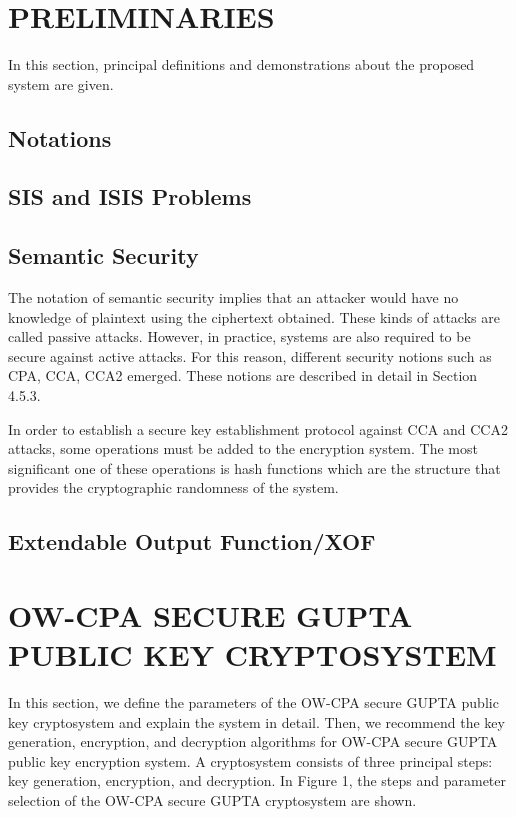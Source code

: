 \documentclass[a4paper,fleqn]{cas-dc}
\begin{document}
\section{PRELIMINARIES}

	In this section, principal definitions and demonstrations about the proposed system are given.

\subsection{Notations}


\subsection{SIS and ISIS Problems}





\subsection{Semantic Security}

	The notation of semantic security implies that an attacker would have no knowledge of plaintext using the ciphertext obtained. These kinds of attacks are called passive attacks. However, in practice, systems are also required to be secure against active attacks. For this reason, different security notions such as CPA, CCA, CCA2 emerged. These notions are described in detail in Section 4.5.3. 
	
	In order to establish a secure key establishment protocol against CCA and CCA2 attacks, some operations must be added to the encryption system. The most significant one of these operations is hash functions which are the structure that provides the cryptographic randomness of the system.

\subsection{Extendable Output Function/XOF}


\section{OW-CPA SECURE GUPTA PUBLIC KEY CRYPTOSYSTEM}
	In this section, we define the parameters of the OW-CPA secure GUPTA public key cryptosystem and explain the system in detail. Then, we recommend the key generation, encryption, and decryption algorithms for OW-CPA secure GUPTA public key encryption system. A cryptosystem consists of three principal steps: key generation, encryption, and decryption. In Figure 1, the steps and parameter selection of the OW-CPA secure GUPTA cryptosystem are shown.
\end{document}

